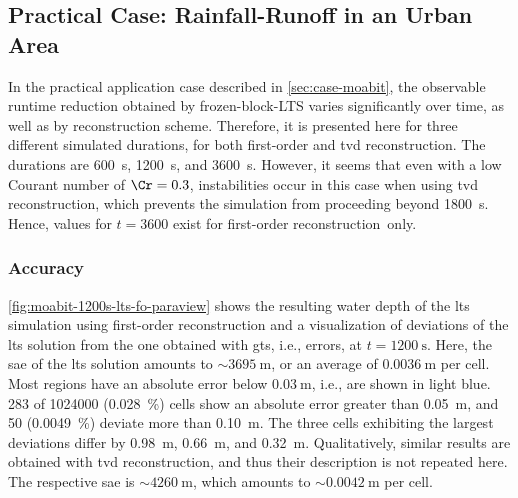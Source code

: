 \FloatBarrier
\subsection{Practical Case: Rainfall-Runoff in an Urban Area} \label{sec:results-moabit}

In the practical application case described in 
\autoref{sec:case-moabit}, the observable runtime reduction obtained by \gls{frozen-block-LTS} varies significantly over time, as well as by reconstruction scheme.
Therefore, it is presented here for three different simulated durations, for both first-order and \gls{tvd} reconstruction.
The durations are 
\SI{600}{\second}, \SI{1200}{\second}, and \SI{3600}{\second}.
However, 
it seems that even with a low Courant number of $\Cr = 0.3$, instabilities occur in this case when using \gls{tvd} reconstruction, 
which prevents the simulation from proceeding beyond \SI{1800}{\second}.
Hence, values for $t = 3600$ exist for first-order reconstruction~only.

\subsubsection{Accuracy}

\autoref{fig:moabit-1200s-lts-fo-paraview} shows the resulting water depth of the \gls{lts} simulation using first-order reconstruction and a visualization of deviations of the \gls{lts} solution from the one obtained with \gls{gts}, i.e., errors, at $t=\SI{1200}{\second}$.
Here, the \gls{sae} of the \gls{lts} solution amounts to $\sim\!\SI{3695}{\meter}$, or an average of $\SI{0.0036}{\meter}$ per cell. 
Most regions have an absolute error below $\SI{0.03}{\meter}$, i.e., are shown in light blue.
283 of 1024000 (\SI{0.028}{\percent}) cells show an absolute error greater than \SI{0.05}{\meter}, and 50 (\SI{0.0049}{\percent}) deviate more than \SI{0.10}{\meter}.
The three cells exhibiting the largest deviations differ by \SI{0.98}{\meter},  \SI{0.66}{\meter}, and \SI{0.32}{\meter}.
Qualitatively, similar results are obtained with \gls{tvd} reconstruction, and thus their description is not repeated here. The respective \gls{sae} is $\sim\!\SI{4260}{\meter}$, which amounts to $\sim\!\SI{0.0042}{\meter}$ per cell.

